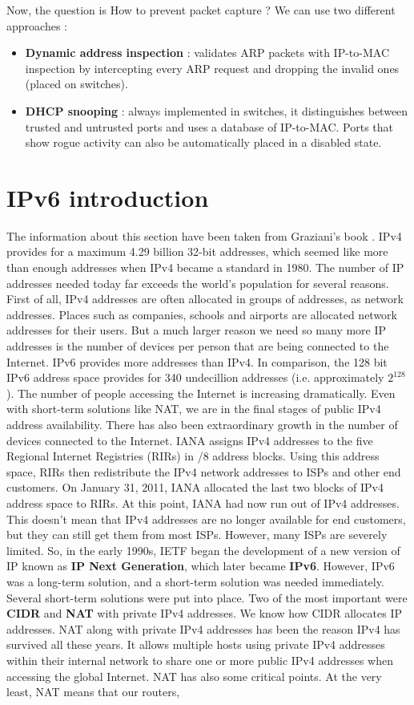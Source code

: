 \documentclass[11pt]{article}
\begin{document}
Now, the question is How to prevent packet capture ? We can use two different approaches :
\begin{itemize}
\item \textbf{Dynamic address inspection} : validates ARP packets with IP-to-MAC inspection by intercepting every ARP request and dropping the invalid ones (placed on switches).
\item \textbf{DHCP snooping} : always implemented in switches, it distinguishes between trusted and untrusted ports and uses a database of IP-to-MAC. Ports that show rogue activity can also be automatically placed in a disabled state.
\end{itemize}
\section{IPv6 introduction}
The information about this section have been taken from Graziani's book \cite{ipv6_fundamentals}. IPv4 provides for a maximum 4.29 billion 32-bit addresses, which seemed like more than enough addresses when IPv4 became a standard in 1980. The number of IP addresses needed today far exceeds the world's population for several reasons. First of all, IPv4 addresses are often allocated in groups of addresses, as network addresses. Places such as companies, schools and airports are allocated network addresses
for their users. But a much larger reason we need so many more IP addresses is the number of devices per person that are being connected to the Internet. IPv6 provides more addresses than IPv4. In comparison, the 128 bit IPv6 address space provides for 340 undecillion addresses (i.e. approximately $2^{128}$). The number of people accessing the Internet is increasing dramatically. Even with short-term solutions like NAT, we are in the final stages of public IPv4 address availability. There has also been extraordinary growth in the number of devices connected to the Internet. IANA assigns IPv4 addresses to the five Regional Internet Registries (RIRs) in /8 address blocks. Using this address space, RIRs then redistribute the IPv4 network addresses to ISPs and other end customers. On January 31, 2011, IANA allocated the last two blocks of IPv4 address space to RIRs. At this point, IANA had now run out of IPv4 addresses. This doesn't mean that IPv4 addresses are no longer available for end customers, but
they can still get them from most ISPs. However, many ISPs are severely limited. So, in the early 1990s, IETF began the development of a new version of IP known as \textbf{IP Next Generation}, which later became \textbf{IPv6}. However, IPv6 was a long-term solution, and a short-term solution was needed immediately. Several short-term solutions were put into place. Two of the most important were \textbf{CIDR} and \textbf{NAT} with private IPv4 addresses. We know how CIDR allocates IP addresses. NAT along with private IPv4 addresses has been the reason IPv4 has survived all these years. It allows multiple hosts using private IPv4  addresses within their internal network to share one or more public IPv4 addresses when accessing the global Internet. NAT has also some critical points. At the very least, NAT means that our routers,
\end{document}
